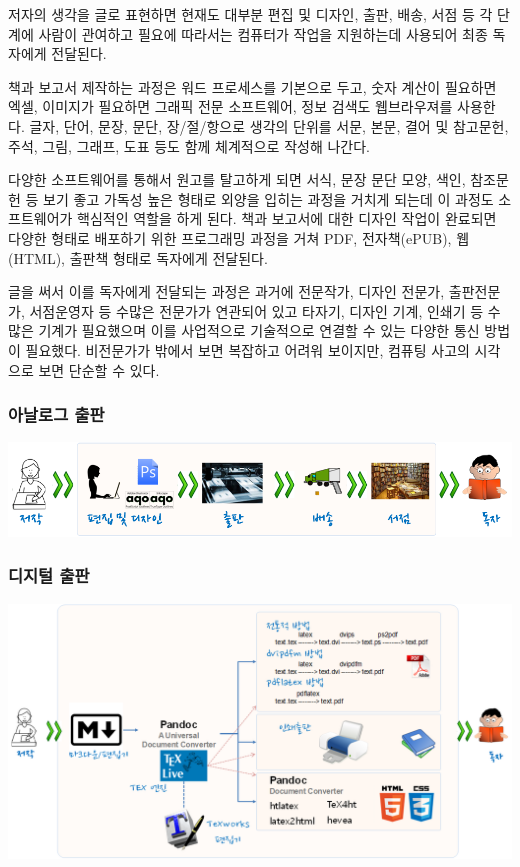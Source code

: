 \documentclass[
  a4paper,
]{report}
\begin{document}
저자의 생각을 글로 표현하면 현재도 대부분 편집 및 디자인, 출판, 배송,
서점 등 각 단계에 사람이 관여하고 필요에 따라서는 컴퓨터가 작업을
지원하는데 사용되어 최종 독자에게 전달된다.

책과 보고서 제작하는 과정은 워드 프로세스를 기본으로 두고, 숫자 계산이
필요하면 엑셀, 이미지가 필요하면 그래픽 전문 소프트웨어, 정보 검색도
웹브라우져를 사용한다. 글자, 단어, 문장, 문단, 장/절/항으로 생각의
단위를 서문, 본문, 결어 및 참고문헌, 주석, 그림, 그래프, 도표 등도 함께
체계적으로 작성해 나간다.

다양한 소프트웨어를 통해서 원고를 탈고하게 되면 서식, 문장 문단 모양,
색인, 참조문헌 등 보기 좋고 가독성 높은 형태로 외양을 입히는 과정을
거치게 되는데 이 과정도 소프트웨어가 핵심적인 역할을 하게 된다. 책과
보고서에 대한 디자인 작업이 완료되면 다양한 형태로 배포하기 위한
프로그래밍 과정을 거쳐 PDF, 전자책(ePUB), 웹(HTML), 출판책 형태로
독자에게 전달된다.

글을 써서 이를 독자에게 전달되는 과정은 과거에 전문작가, 디자인 전문가,
출판전문가, 서점운영자 등 수많은 전문가가 연관되어 있고 타자기, 디자인
기계, 인쇄기 등 수많은 기계가 필요했으며 이를 사업적으로 기술적으로
연결할 수 있는 다양한 통신 방법이 필요했다. 비전문가가 밖에서 보면
복잡하고 어려워 보이지만, 컴퓨팅 사고의 시각으로 보면 단순할 수 있다.

\hypertarget{uxc544uxb0a0uxb85cuxadf8-uxcd9cuxd310}{%
\subsubsection{아날로그
출판}\label{uxc544uxb0a0uxb85cuxadf8-uxcd9cuxd310}}

\includegraphics{fig/pdf-analog.png}

\hypertarget{uxb514uxc9c0uxd138-uxcd9cuxd310}{%
\subsubsection{디지털 출판}\label{uxb514uxc9c0uxd138-uxcd9cuxd310}}

\includegraphics{fig/pdf-digital.png}
\end{document}
